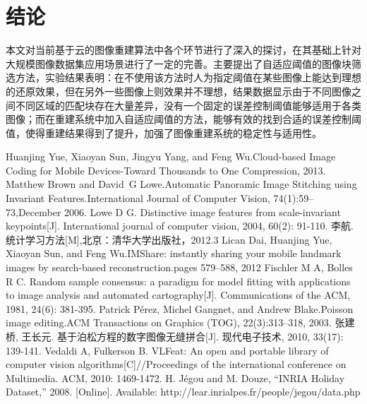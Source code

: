 \documentclass[UTF8]{csoarticle}
\begin{document}
\section{结论}

本文对当前基于云的图像重建算法中各个环节进行了深入的探讨，在其基础上针对大规模图像数据集应用场景进行了一定的完善。主要提出了自适应阈值的图像块筛选方法，实验结果表明：在不使用该方法时人为指定阈值在某些图像上能达到理想的还原效果，但在另外一些图像上则效果并不理想，结果数据显示由于不同图像之间不同区域的匹配块存在大量差异，没有一个固定的误差控制阈值能够适用于各类图像；而在重建系统中加入自适应阈值的方法，能够有效的找到合适的误差控制阈值，使得重建结果得到了提升，加强了图像重建系统的稳定性与适用性。

\begin{thebibliography}{10} %
     Huanjing Yue, Xiaoyan Sun, Jingyu Yang, and Feng Wu.Cloud-based Image Coding for Mobile Devices-Toward Thousands to One Compression, 2013.
     Matthew Brown and David~G Lowe.Automatic Panoramic Image Stitching using Invariant Features.International Journal of Computer Vision, 74(1):59--73,December 2006.
     Lowe D G. Distinctive image features from scale-invariant keypoints[J]. International journal of computer vision, 2004, 60(2): 91-110.
     李航.统计学习方法[M],北京：清华大学出版社，2012.3
     Lican Dai, Huanjing Yue, Xiaoyan Sun, and Feng Wu.IMShare: instantly sharing your mobile landmark images by search-based reconstruction.pages 579--588, 2012
     Fischler M A, Bolles R C. Random sample consensus: a paradigm for model fitting with applications to image analysis and automated cartography[J]. Communications of the ACM, 1981, 24(6): 381-395.
     Patrick P{\'e}rez, Michel Gangnet, and Andrew Blake.Poisson image editing.ACM Transactions on Graphics (TOG), 22(3):313--318, 2003.
     张建桥, 王长元. 基于泊松方程的数字图像无缝拼合[J]. 现代电子技术, 2010, 33(17): 139-141.
     Vedaldi A, Fulkerson B. VLFeat: An open and portable library of computer vision algorithms[C]//Proceedings of the international conference on Multimedia. ACM, 2010: 1469-1472.
     H. Jégou and M. Douze, “INRIA Holiday Dataset,” 2008. [Online]. Available: http://lear.inrialpes.fr/people/jegou/data.php
\end{thebibliography}
\end{document}
